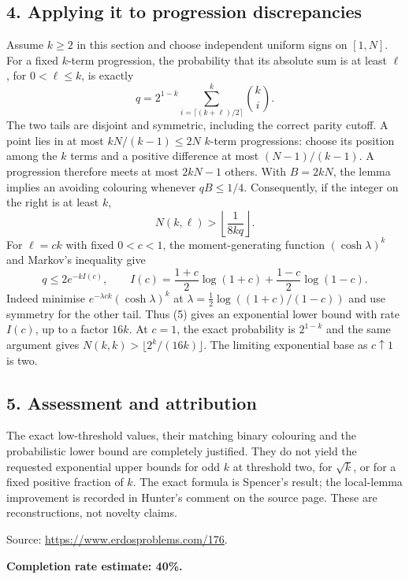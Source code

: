 \subsection*{4. Applying it to progression discrepancies}
Assume $k\ge2$ in this section and choose independent uniform signs on $[1,N]$. For a fixed $k$-term progression, the probability that its absolute sum is at least $\ell$, for $0<\ell\le k$, is exactly
\[
 q=2^{1-k}\sum_{i=\lceil(k+\ell)/2\rceil}^k\binom ki.\tag{4}
\]
The two tails are disjoint and symmetric, including the correct parity cutoff.
A point lies in at most $kN/(k-1)\le2N$ $k$-term progressions: choose its position among the $k$ terms and a positive difference at most $(N-1)/(k-1)$. A progression therefore meets at most $2kN-1$ others. With $B=2kN$, the lemma implies an avoiding colouring whenever $qB\le1/4$. Consequently, if the integer on the right is at least $k$,
\[
 N(k,\ell)>\left\lfloor\frac1{8kq}\right\rfloor.\tag{5}
\]
For $\ell=ck$ with fixed $0<c<1$, the moment-generating function $(\cosh\lambda)^k$ and Markov's inequality give
\[
 q\le2e^{-kI(c)},\qquad
 I(c)=\frac{1+c}{2}\log(1+c)+\frac{1-c}{2}\log(1-c).
\]
Indeed minimise $e^{-\lambda ck}(\cosh\lambda)^k$ at $\lambda=\tfrac12\log((1+c)/(1-c))$ and use symmetry for the other tail. Thus (5) gives an exponential lower bound with rate $I(c)$, up to a factor $16k$. At $c=1$, the exact probability is $2^{1-k}$ and the same argument gives $N(k,k)>\lfloor2^k/(16k)\rfloor$. The limiting exponential base as $c\uparrow1$ is two.

\subsection*{5. Assessment and attribution}
The exact low-threshold values, their matching binary colouring and the probabilistic lower bound are completely justified. They do not yield the requested exponential upper bounds for odd $k$ at threshold two, for $\sqrt k$, or for a fixed positive fraction of $k$. The exact formula is Spencer's result; the local-lemma improvement is recorded in Hunter's comment on the source page. These are reconstructions, not novelty claims.

Source: \url{https://www.erdosproblems.com/176}.

\textbf{Completion rate estimate: 40\%.}

